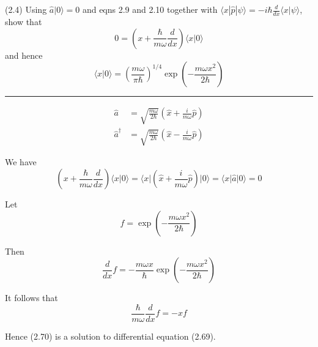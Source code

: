 \documentclass[12pt]{article}
\begin{document}
(2.4)
Using $\hat a|0\rangle=0$ and eqns 2.9 and 2.10 together with
$\langle x|\hat p|\psi\rangle=-i\hbar\frac{d}{dx}\langle x|\psi\rangle$, show that
\begin{equation*}
0=\left(x+\frac{\hbar}{m\omega}\frac{d}{dx}\right)
\langle x|0\rangle
\tag{2.69}
\end{equation*}
and hence
\begin{equation*}
\langle x|0\rangle=\left(\frac{m\omega}{\pi\hbar}\right)^{1/4}
\exp\left(-\frac{m\omega x^2}{2\hbar}\right)
\tag{2.70}
\end{equation*}

\bigskip
\hrule

\bigskip
\begin{align*}
\hat a&=\sqrt{\frac{m\omega}{2\hbar}}
\left(\hat x+\frac{i}{m\omega}\hat p\right)
\tag{2.9}
\\
\hat a^\dag&=\sqrt{\frac{m\omega}{2\hbar}}
\left(\hat x-\frac{i}{m\omega}\hat p\right)
\tag{2.10}
\end{align*}

We have
\begin{equation*}
\left(x+\frac{\hbar}{m\omega}\frac{d}{dx}\right)\langle x|0\rangle
=\langle x|\left(\hat x+\frac{i}{m\omega}\hat p\right)|0\rangle
=\langle x|\hat a|0\rangle
=0
\end{equation*}

Let
\begin{equation*}
f=\exp\left(-\frac{m\omega x^2}{2\hbar}\right)
\end{equation*}

Then
\begin{equation*}
\frac{d}{dx}f=-\frac{m\omega x}{\hbar}\exp\left(-\frac{m\omega x^2}{2\hbar}\right)
\end{equation*}

It follows that
\begin{equation*}
\frac{\hbar}{m\omega}\frac{d}{dx}f=-xf
\end{equation*}

Hence (2.70) is a solution to differential equation (2.69).
\end{document}
